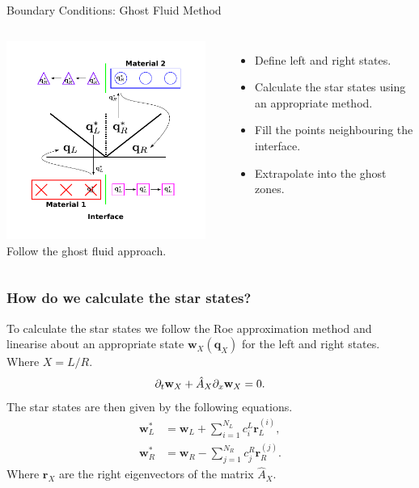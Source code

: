 \documentclass{beamer}
\begin{document}
\begin{frame}{Boundary Conditions: Ghost Fluid Method}
\begin{columns}
\column{6.5cm}
\centering
\includegraphics[width=6.5cm]{../images/multimodel_roe}
\column{4.5cm}
Follow the ghost fluid approach.
\begin{itemize}
\item{Define left and right states.}
\item{Calculate the star states using an appropriate method.}
\item{Fill the points neighbouring the interface.}
\item{Extrapolate into the ghost zones.}
\end{itemize}
\end{columns}
\end{frame}

\begin{frame}
\frametitle{How do we calculate the star states?}
To calculate the star states we follow the Roe approximation method and linearise about an appropriate state $\mathbf{w}_X(\mathbf{q}_X)$ for the left and right states. Where $X = L/R$.
\begin{equation}
\partial_t\mathbf{w}_X + \hat{A}_X\partial_{\mathnormal{x}}\mathbf{w}_X = 0.
\end{equation}
The star states are then given by the following equations.
\begin{align}
\mathbf{w}^*_L &= \mathbf{w}_L+\sum^{N_L}_{i=1}c^L_{i}\mathbf{r}^{(i)}_L,\\
\mathbf{w}^*_R &= \mathbf{w}_R-\sum^{N_R}_{j=1}c^R_{j}\mathbf{r}^{(j)}_R.
\end{align}
Where $\mathbf{r}_X$ are the right eigenvectors of the matrix $\hat{A}_X$.
\end{frame}
\end{document}
